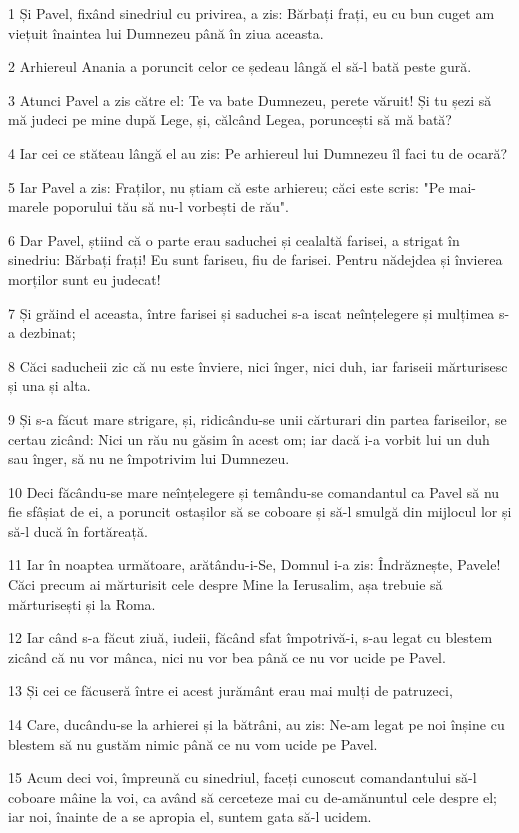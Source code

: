 \par 1 Și Pavel, fixând sinedriul cu privirea, a zis: Bărbați frați, eu cu bun cuget am viețuit înaintea lui Dumnezeu până în ziua aceasta.
\par 2 Arhiereul Anania a poruncit celor ce ședeau lângă el să-l bată peste gură.
\par 3 Atunci Pavel a zis către el: Te va bate Dumnezeu, perete văruit! Și tu șezi să mă judeci pe mine după Lege, și, călcând Legea, poruncești să mă bată?
\par 4 Iar cei ce stăteau lângă el au zis: Pe arhiereul lui Dumnezeu îl faci tu de ocară?
\par 5 Iar Pavel a zis: Fraților, nu știam că este arhiereu; căci este scris: "Pe mai-marele poporului tău să nu-l vorbești de rău".
\par 6 Dar Pavel, știind că o parte erau saduchei și cealaltă farisei, a strigat în sinedriu: Bărbați frați! Eu sunt fariseu, fiu de farisei. Pentru nădejdea și învierea morților sunt eu judecat!
\par 7 Și grăind el aceasta, între farisei și saduchei s-a iscat neînțelegere și mulțimea s-a dezbinat;
\par 8 Căci saducheii zic că nu este înviere, nici înger, nici duh, iar fariseii mărturisesc și una și alta.
\par 9 Și s-a făcut mare strigare, și, ridicându-se unii cărturari din partea fariseilor, se certau zicând: Nici un rău nu găsim în acest om; iar dacă i-a vorbit lui un duh sau înger, să nu ne împotrivim lui Dumnezeu.
\par 10 Deci făcându-se mare neînțelegere și temându-se comandantul ca Pavel să nu fie sfâșiat de ei, a poruncit ostașilor să se coboare și să-l smulgă din mijlocul lor și să-l ducă în fortăreață.
\par 11 Iar în noaptea următoare, arătându-i-Se, Domnul i-a zis: Îndrăznește, Pavele! Căci precum ai mărturisit cele despre Mine la Ierusalim, așa trebuie să mărturisești și la Roma.
\par 12 Iar când s-a făcut ziuă, iudeii, făcând sfat împotrivă-i, s-au legat cu blestem zicând că nu vor mânca, nici nu vor bea până ce nu vor ucide pe Pavel.
\par 13 Și cei ce făcuseră între ei acest jurământ erau mai mulți de patruzeci,
\par 14 Care, ducându-se la arhierei și la bătrâni, au zis: Ne-am legat pe noi înșine cu blestem să nu gustăm nimic până ce nu vom ucide pe Pavel.
\par 15 Acum deci voi, împreună cu sinedriul, faceți cunoscut comandantului să-l coboare mâine la voi, ca având să cerceteze mai cu de-amănuntul cele despre el; iar noi, înainte de a se apropia el, suntem gata să-l ucidem.
